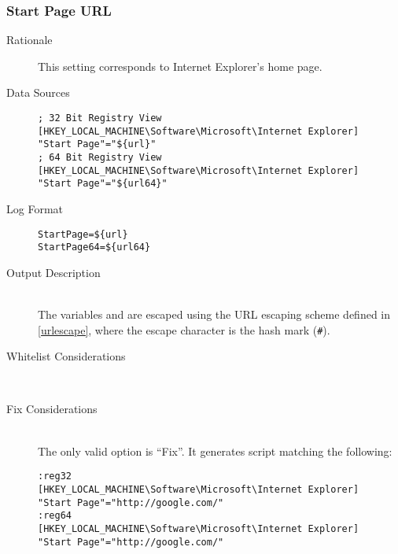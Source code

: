 \subsubsection{Start Page URL}
\begin{description}
\item[Rationale] This setting corresponds to Internet Explorer's home page.

\item[Data Sources] \hfill
\vspace{-\baselineskip}
\begin{verbatim}
; 32 Bit Registry View
[HKEY_LOCAL_MACHINE\Software\Microsoft\Internet Explorer]
"Start Page"="${url}"
; 64 Bit Registry View
[HKEY_LOCAL_MACHINE\Software\Microsoft\Internet Explorer]
"Start Page"="${url64}"
\end{verbatim}
\item[Log Format] \hfill
\vspace{-\baselineskip}
\begin{verbatim} 
StartPage=${url}
StartPage64=${url64}
\end{verbatim}
\item[Output Description] \hfill \\
The variables  and  are escaped using the URL escaping
scheme defined in \ref{urlescape}, where the escape character is the hash mark
(\verb|#|).
\item[Whitelist Considerations] \hfill \\

\item[Fix Considerations] \hfill \\
The only valid option is ``Fix''. It generates script matching the following:
\vspace{-\baselineskip}
\begin{verbatim}
:reg32
[HKEY_LOCAL_MACHINE\Software\Microsoft\Internet Explorer]
"Start Page"="http://google.com/"
:reg64
[HKEY_LOCAL_MACHINE\Software\Microsoft\Internet Explorer]
"Start Page"="http://google.com/"
\end{verbatim}
\end{description}

